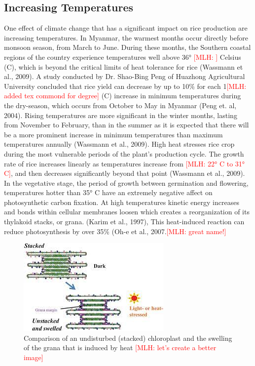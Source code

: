 \documentclass{book}\usepackage{knitr}
\newcommand{\red}[1]{\textcolor{red}{[MLH: #1]}}
\begin{document}
\begin{knitrout}
\begin{kframe}
{\section{Increasing Temperatures}
One effect of climate change that has a significant impact on rice production are increasing temperatures. In Myanmar, the warmest months occur directly before monsoon season, from March to June. During these months, the Southern coastal regions of the country experience temperatures well above 36° \red{\degree} Celsius (C), which is beyond the critical limits of heat tolerance for rice (Wassmann et al., 2009). A study conducted by Dr. Shao-Bing Peng of Huazhong Agricultural University concluded that rice yield can decrease by up to 10\% for each 1\degree \red{added tex commond for degree} (C) increase in minimum temperatures during the dry-season, which occurs from October to May in Myanmar (Peng et. al, 2004). Rising temperatures are more significant in the winter months, lasting from November to February, than in the summer as it is expected that there will be a more prominent increase in minimum temperatures than maximum temperatures annually (Wassmann et al., 2009). 
High heat stresses rice crop during the most vulnerable periods of the plant’s production cycle. The growth rate of rice increases linearly as temperatures increase from \red{22° C to 31° C}, and then decreases significantly beyond that point (Wassmann et al., 2009). In the vegetative stage, the period of growth between germination and flowering, temperatures hotter than 35° C have an extremely negative affect on photosynthetic carbon fixation. At high temperatures kinetic energy increases and bonds within cellular membranes loosen which creates a reorganization of its thylakoid stacks, or grana. (Karim et al., 1997), This heat-induced reaction can reduce photosynthesis by over 35\% (Oh-e et al., 2007.\red{great name!}

\begin{figure}
\includegraphics[width=\linewidth]{images/myanmar/Image4.jpg}
\caption{Comparison of an undisturbed (stacked) chloroplast and the swelling of the grana that is induced by heat \red{let's create a better image}}
\end{figure}

}
\end{kframe}
\end{knitrout}
\end{document}
